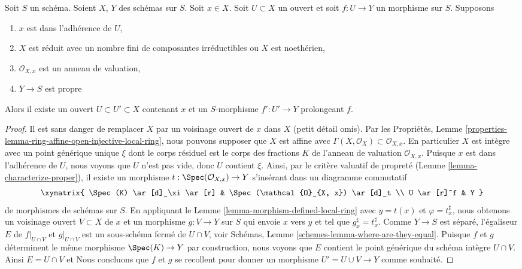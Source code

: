 \begin{lemma}
\label{lemma-extend-across}
Soit $S$ un schéma. Soient $X$, $Y$ des schémas sur $S$. Soit
$x \in X$. Soit $U \subset X$ un ouvert et soit $f : U \to Y$ un morphisme sur $S$.
Supposons
\begin{enumerate}
\item $x$ est dans l'adhérence de $U$,
\item $X$ est réduit avec un nombre fini de composantes irréductibles ou $X$
est noethérien,
\item $\mathcal{O}_{X, x}$ est un anneau de valuation,
\item $Y \to S$ est propre
\end{enumerate}
Alors il existe un ouvert $U \subset U' \subset X$ contenant $x$ et un
$S$-morphisme $f' : U' \to Y$ prolongeant $f$.
\end{lemma}

\begin{proof}
Il est sans danger de remplacer $X$ par un voisinage ouvert de
$x$ dans $X$ (petit détail
omis). Par les Propriétés, Lemme \ref{properties-lemma-ring-affine-open-injective-local-ring}, nous pouvons supposer
que $X$ est affine
avec $\Gamma(X, \mathcal{O}_X) \subset \mathcal{O}_{X, x}$. En particulier $X$ est intègre
avec un point générique unique $\xi$ dont le corps résiduel
est le corps des fractions $K$ de l'anneau
de valuation $\mathcal{O}_{X, x}$. Puisque
$x$ est dans l'adhérence de $U$, nous voyons
que $U$ n'est pas vide, donc $U$ contient $\xi$.
Ainsi, par le critère valuatif de propreté
(Lemme \ref{lemma-characterize-proper}), il existe un morphisme $t : \Spec(\mathcal{O}_{X, x}) \to Y$
s'insérant dans un diagramme commutatif
$$
\xymatrix{
\Spec(K) \ar[d]_\xi \ar[r] & \Spec(\mathcal{O}_{X, x}) \ar[d]_t \\
U \ar[r]^f & Y
}
$$
de morphismes de schémas sur $S$. En
appliquant le Lemme \ref{lemma-morphism-defined-local-ring} avec $y = t(x)$
et $\varphi = t^\sharp_x$, nous obtenons un voisinage ouvert $V \subset X$
de $x$ et un morphisme $g : V \to Y$ sur $S$ qui
envoie $x$ vers $y$ et tel que $g^\sharp_x = t^\sharp_x$. Comme $Y \to S$
est séparé, l'égaliseur $E$ de $f|_{U \cap V}$ et $g|_{U \cap V}$
est un sous-schéma fermé de $U \cap V$, voir Schémas, Lemme
\ref{schemes-lemma-where-are-they-equal}. Puisque $f$ et $g$ déterminent
le même morphisme $\Spec(K) \to Y$ par construction, nous voyons
que $E$ contient le point générique du schéma intègre
$U \cap V$. Ainsi $E = U \cap V$ et Nous concluons que $f$
et $g$ se recollent pour donner un morphisme $U' = U \cup V \to Y$
comme souhaité.
\end{proof}





